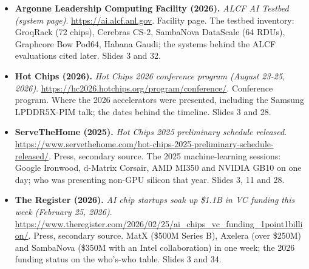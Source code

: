 \begin{itemize}[leftmargin=1.2em,itemsep=3pt]
\item \textbf{Argonne Leadership Computing Facility (2026).} \textit{ALCF AI Testbed (system page)}. \url{https://ai.alcf.anl.gov}. Facility page. The testbed inventory: GroqRack (72 chips), Cerebras CS-2, SambaNova DataScale (64 RDUs), Graphcore Bow Pod64, Habana Gaudi; the systems behind the ALCF evaluations cited later. Slides 3 and 32.
\item \textbf{Hot Chips (2026).} \textit{Hot Chips 2026 conference program (August 23-25, 2026)}. \url{https://hc2026.hotchips.org/program/conference/}. Conference program. Where the 2026 accelerators were presented, including the Samsung LPDDR5X-PIM talk; the dates behind the timeline. Slides 3 and 28.
\item \textbf{ServeTheHome (2025).} \textit{Hot Chips 2025 preliminary schedule released}. \url{https://www.servethehome.com/hot-chips-2025-preliminary-schedule-released/}. Press, secondary source. The 2025 machine-learning sessions: Google Ironwood, d-Matrix Corsair, AMD MI350 and NVIDIA GB10 on one day; who was presenting non-GPU silicon that year. Slides 3, 11 and 28.
\item \textbf{The Register (2026).} \textit{AI chip startups soak up \$1.1B in VC funding this week (February 25, 2026)}. \url{https://www.theregister.com/2026/02/25/ai_chips_vc_funding_1point1billion/}. Press, secondary source. MatX (\$500M Series B), Axelera (over \$250M) and SambaNova (\$350M with an Intel collaboration) in one week; the 2026 funding status on the who's-who table. Slides 3 and 34.
\end{itemize}
